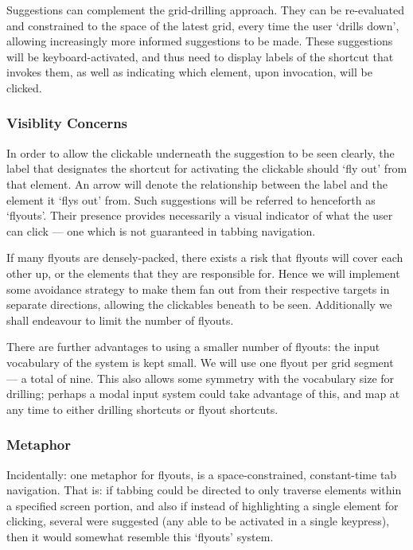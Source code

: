 \documentclass[a4paper, 12pt]{report}
\begin{document}
Suggestions can complement the grid-drilling approach. They can be re-evaluated and constrained to the space of the latest grid, every time the user `drills down', allowing increasingly more informed suggestions to be made. These suggestions will be keyboard-activated, and thus need to display labels of the shortcut that invokes them, as well as indicating which element, upon invocation, will be clicked.

\subsubsection{Visiblity Concerns}
In order to allow the clickable underneath the suggestion to be seen clearly, the label that designates the shortcut for activating the clickable should `fly out' from that element. An arrow will denote the relationship between the label and the element it `flys out' from. Such suggestions will be referred to henceforth as `flyouts'. Their presence provides necessarily a visual indicator of what the user can click --- one which is not guaranteed in tabbing navigation.

If many flyouts are densely-packed, there exists a risk that flyouts will cover each other up, or the elements that they are responsible for. Hence we will implement some avoidance strategy to make them fan out from their respective targets in separate directions, allowing the clickables beneath to be seen. Additionally we shall endeavour to limit the number of flyouts.

There are further advantages to using a smaller number of flyouts: the input vocabulary of the system is kept small. We will use one flyout per grid segment --- a total of nine. This also allows some symmetry with the vocabulary size for drilling; perhaps a modal input system could take advantage of this, and map at any time to either drilling shortcuts or flyout shortcuts.

\subsubsection{Metaphor}
Incidentally: one metaphor for flyouts, is a space-constrained, constant-time tab navigation. That is: if tabbing could be directed to only traverse elements within a specified screen portion, and also if instead of highlighting a single element for clicking, several were suggested (any able to be activated in a single keypress), then it would somewhat resemble this `flyouts' system.
\end{document}
